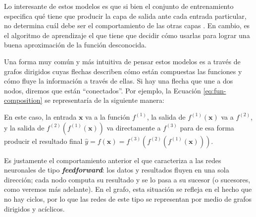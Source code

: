 \documentclass[../../main.tex]{subfiles}
\begin{document}
Lo interesante de estos modelos es que si bien el conjunto de entrenamiento especifica qué
tiene que producir la capa de salida ante cada entrada particular, no determina cuál debe
ser el comportamiento de las otras capas \cite{deep-learning}. En cambio, es el algoritmo
de aprendizaje el que tiene que decidir cómo usarlas para lograr una buena aproximación de
la función desconocida.

Una forma muy común y más intuitiva de pensar estos modelos es a través de grafos
dirigidos cuyas flechas describen cómo están compuestas las funciones y cómo fluye la
información a través de ellas. Si hay una flecha que une a dos nodos, diremos que están
``conectados''. Por ejemplo, la Ecuación \ref{eq:fun-composition} se representaría de la
siguiente manera:
\begin{center}
\end{center}

En este caso, la entrada \(\bm{x}\) va a la función \(f^{(1)}\), la salida de
\(f^{(1)}(\bm{x})\) va a \(f^{(2)}\), y la salida de \(f^{(2)}(f^{(1)}(\bm{x}))\)
va directamente a \(f^{(3)}\) para de esa forma producir el resultado final \(\hat{y} =
f(\bm{x}) = f^{(3)}(f^{(2)}(f^{(1)}(\bm{x})))\).

Es justamente el comportamiento anterior el que caracteriza a las redes neuronales de tipo
\textbf{\textit{feedforward}}: los datos y resultados fluyen en una sola dirección; cada
nodo computa su resultado y se lo pasa a su sucesor (o sucesores, como veremos más
adelante). En el grafo, esta situación se refleja en el hecho que no hay ciclos, por lo
que las redes de este tipo se representan por medio de grafos dirigidos y acíclicos.
\end{document}
